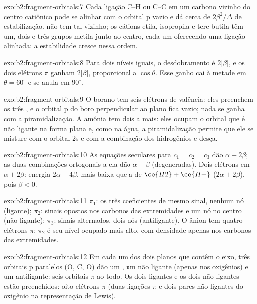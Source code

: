 \begin{solution}{exo:b2:fragment-orbitals:7}
Cada ligação C--H ou C--C em um carbono vizinho do centro catiônico pode se
alinhar com o orbital p vazio e dá cerca de $2\beta^2/\Delta$ de estabilização.
 não tem tal vizinho; os cátions etila, isopropila e terc-butila têm
um, dois e três grupos metila junto ao centro, cada um oferecendo uma ligação
alinhada: a estabilidade cresce nessa ordem.
\end{solution}

\begin{solution}{exo:b2:fragment-orbitals:8}
Para dois níveis iguais, o desdobramento é $2|\beta|$, e os dois elétrons $\pi$
ganham $2|\beta|$, proporcional a $\cos\theta$. Esse ganho cai à metade em
$\theta = 60^\circ$ e se anula em $90^\circ$.
\end{solution}

\begin{solution}{exo:b2:fragment-orbitals:9}
O borano tem seis elétrons de valência: eles preenchem os três , e o orbital p do boro perpendicular ao plano fica vazio; nada se
ganha com a piramidalização. A amônia tem dois a mais: eles ocupam o orbital
que é não ligante na forma plana e, como na água, a piramidalização permite
que ele se misture com o orbital 2s e com a combinação dos hidrogênios e desça.
\end{solution}

\begin{solution}{exo:b2:fragment-orbitals:10}
As equações seculares para $c_1 = c_2 = c_3$ dão $\alpha + 2\beta$; as duas
combinações ortogonais a ela dão $\alpha - \beta$ (degeneradas). Dois elétrons em
$\alpha + 2\beta$: energia
$2\alpha + 4\beta$, mais baixa que a de $\ce{H2} + \ce{H+}$ ($2\alpha + 2\beta$), pois $\beta < 0$.
\end{solution}

\begin{solution}{exo:b2:fragment-orbitals:11}
$\pi_1$: os três coeficientes de mesmo sinal, nenhum nó (ligante); $\pi_2$: sinais
opostos nos carbonos das extremidades e um nó no centro (não ligante); $\pi_3$:
sinais alternados, dois nós (antiligante). O ânion tem quatro elétrons $\pi$:
$\pi_2$ é seu nível ocupado mais alto, com densidade apenas nos carbonos das
extremidades.
\end{solution}

\begin{solution}{exo:b2:fragment-orbitals:12}
Em cada um dos dois planos que contêm o eixo, três orbitais p paralelos (O, C, O)
dão um , um não ligante (apenas nos oxigênios) e um antiligante:
seis orbitais $\pi$ ao todo. Os dois ligantes e os dois não ligantes estão
preenchidos: oito elétrons $\pi$ (duas ligações $\pi$ e dois pares não
ligantes do oxigênio na representação de Lewis).
\end{solution}

